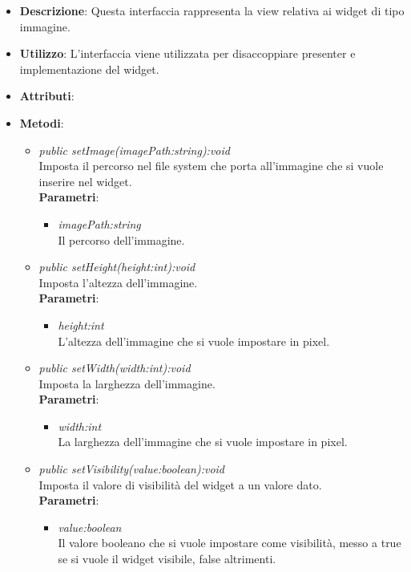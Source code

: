 \begin{itemize}
\item \textbf{Descrizione}: Questa interfaccia rappresenta la view relativa ai widget di tipo immagine.
\item \textbf{Utilizzo}: L'interfaccia viene utilizzata per disaccoppiare presenter e implementazione del widget.
\item \textbf{Attributi}:
\item \textbf{Metodi}:
	\begin{itemize}
	\item \textit{public setImage(imagePath:string):void}\\
	Imposta il percorso nel file system che porta all'immagine che si vuole inserire nel widget.
		\\ \textbf{Parametri}: \begin{itemize}
		\item \textit{imagePath:string}\\
		Il percorso dell'immagine.
		\end{itemize} 
	\item \textit{public setHeight(height:int):void}\\
	Imposta l'altezza dell'immagine.
		\\ \textbf{Parametri}: \begin{itemize}
		\item \textit{height:int}\\
		L'altezza dell'immagine che si vuole impostare in pixel.
		\end{itemize} 
	\item \textit{public setWidth(width:int):void}\\
	Imposta la larghezza dell'immagine.
		\\ \textbf{Parametri}: \begin{itemize}
		\item \textit{width:int}\\
		La larghezza dell'immagine che si vuole impostare in pixel.
		\end{itemize} 
	\item \textit{public setVisibility(value:boolean):void}\\
	Imposta il valore di visibilità del widget a un valore dato.
			\\ \textbf{Parametri}: \begin{itemize}
			\item \textit{value:boolean}\\
			Il valore booleano che si vuole impostare come visibilità, messo a true se si vuole il widget visibile, false altrimenti.

\end{itemize}
\end{itemize}
\end{itemize}

